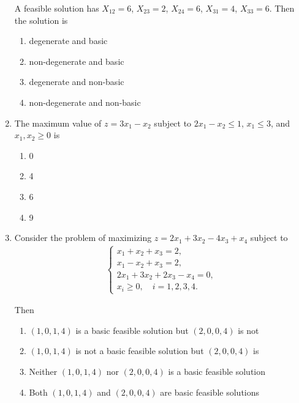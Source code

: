 \documentclass[journal]{IEEEtran}
\numberwithin{equation}{enumi}
\numberwithin{figure}{enumi}
\begin{document}
\begin{enumerate}
A feasible solution has $X_{12} = 6$, $X_{23} = 2$, $X_{24} = 6$, $X_{31} = 4$, $X_{33} = 6$. Then the solution is
\hfill{}
\begin{multicols}{2}
\begin{enumerate}
    \item degenerate and basic
    \item non-degenerate and basic
    \item degenerate and non-basic
    \item non-degenerate and non-basic
\end{enumerate}
\end{multicols}

\item
The maximum value of $z = 3x_1 - x_2$ subject to $2x_1 - x_2 \leq 1$, $x_1 \leq 3$, and $x_1, x_2 \geq 0$ is
\hfill{}
\begin{multicols}{4}
\begin{enumerate}
    \item 0
    \item 4
    \item 6
    \item 9
\end{enumerate}
\end{multicols}

\item
Consider the problem of maximizing $z = 2x_1 + 3x_2 - 4x_3 + x_4$ subject to
\begin{align}
    \begin{cases}
x_1 + x_2 + x_3 = 2, \\
x_1 - x_2 + x_3 = 2, \\
2x_1 + 3x_2 + 2x_3 - x_4 = 0, \\
x_i \geq 0, \quad i=1,2,3,4.
\end{cases}
\end{align}


Then
\hfill{}
\begin{multicols}{2}
\begin{enumerate}
    \item $(1,0,1,4)$ is a basic feasible solution but $(2,0,0,4)$ is not
    \item $(1,0,1,4)$ is not a basic feasible solution but $(2,0,0,4)$ is
    \item Neither $(1,0,1,4)$ nor $(2,0,0,4)$ is a basic feasible solution
    \item Both $(1,0,1,4)$ and $(2,0,0,4)$ are basic feasible solutions
\end{enumerate}
\end{multicols}


\end{enumerate}
\end{document}
